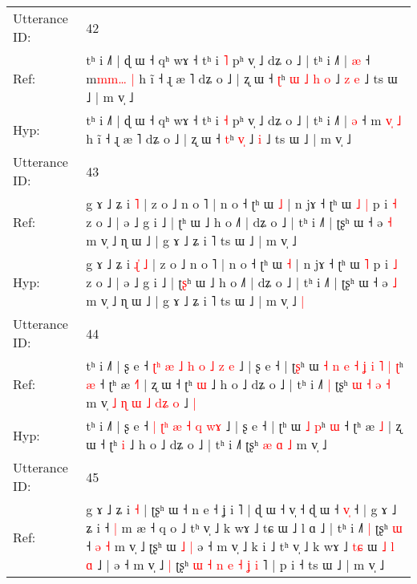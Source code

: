\documentclass[10pt]{article}
\DeclareRobustCommand{\hl}[1]{{\textcolor{red}{#1}}}
\begin{document}
\begin{longtable}{ll}
 \\
\midrule
Utterance ID: & 42 \\
Ref: & tʰ i ˩˥ | ɖ ɯ ˧ qʰ wɤ ˧ tʰ i \hl{˥} pʰ v̩ ˩ dʑ o ˩ | tʰ i ˩˥ | \hl{æ} ˧ m\hl{m}\hl{m}\hl{…} \hl{|} h ĩ ˧ ɻ æ ˥ dʑ o ˩ | ʐ ɯ ˧ \hl{ʈ}ʰ\hl{ }\hl{ɯ}\hl{ }\hl{˩} \hl{h}\hl{ }\hl{o} ˩\hl{ }\hl{z} \hl{e} ˩ ts ɯ ˩ | m v̩ ˩
 \\
Hyp: & tʰ i ˩˥ | ɖ ɯ ˧ qʰ wɤ ˧ tʰ i \hl{˧} pʰ v̩ ˩ dʑ o ˩ | tʰ i ˩˥ | \hl{ə} ˧ m\hl{ }\hl{v}\hl{̩} \hl{˩} h ĩ ˧ ɻ æ ˥ dʑ o ˩ | ʐ ɯ ˧ \hl{t}ʰ\hl{}\hl{}\hl{}\hl{} \hl{}\hl{v}\hl{̩} ˩\hl{}\hl{} \hl{i} ˩ ts ɯ ˩ | m v̩ ˩
 \\
\midrule
Utterance ID: & 43 \\
Ref: & g ɤ ˩ ʑ i\hl{}\hl{}\hl{} \hl{˥} | z o ˩ n o ˥ | n o ˧ ʈʰ ɯ \hl{˩} | n jɤ ˧ ʈʰ ɯ\hl{ }\hl{˩} \hl{|} p i \hl{˧} z o ˩ | ə ˩ g i ˩ | ʈ\hl{}ʰ ɯ ˩ h o ˩˥ | dʑ o ˩ | tʰ i ˩˥ | ʈʂʰ ɯ ˧ ə \hl{˧} m v̩ ˩ ɳ ɯ ˩ | g ɤ ˩ ʑ i ˥ ts ɯ ˩ | m v̩ ˩\hl{}\hl{}
 \\
Hyp: & g ɤ ˩ ʑ i\hl{ }\hl{ɻ}\hl{̍} \hl{˩} | z o ˩ n o ˥ | n o ˧ ʈʰ ɯ \hl{˧} | n jɤ ˧ ʈʰ ɯ\hl{}\hl{} \hl{˥} p i \hl{˩} z o ˩ | ə ˩ g i ˩ | ʈ\hl{ʂ}ʰ ɯ ˩ h o ˩˥ | dʑ o ˩ | tʰ i ˩˥ | ʈʂʰ ɯ ˧ ə \hl{˩} m v̩ ˩ ɳ ɯ ˩ | g ɤ ˩ ʑ i ˥ ts ɯ ˩ | m v̩ ˩\hl{ }\hl{|}
 \\
\midrule
Utterance ID: & 44 \\
Ref: & tʰ i ˩˥ | ʂ e ˧ \hl{ʈ}\hl{ʰ} \hl{æ}\hl{ }\hl{˩} \hl{h} \hl{o} \hl{˩} \hl{z}\hl{ }\hl{e} ˩ | ʂ e ˧ | ʈ\hl{ʂ}ʰ ɯ\hl{ }\hl{˧}\hl{ }\hl{n}\hl{ }\hl{e}\hl{ }\hl{˧}\hl{ }\hl{ʝ}\hl{ }\hl{i}\hl{ }\hl{˥} \hl{|} \hl{ʈ}ʰ \hl{æ} ˧ ʈʰ æ \hl{˧}\hl{˥} | ʐ ɯ ˧ ʈʰ \hl{ɯ} ˩ h o ˩ dʑ o ˩ | tʰ i ˩˥\hl{ }\hl{|} ʈʂʰ\hl{ }\hl{ɯ} \hl{˧} \hl{ə} \hl{˧} m v̩\hl{ }\hl{˩}\hl{ }\hl{ɳ}\hl{ }\hl{ɯ}\hl{ }\hl{˩}\hl{ }\hl{d}\hl{ʑ}\hl{ }\hl{o} ˩\hl{ }\hl{|}
 \\
Hyp: & tʰ i ˩˥ | ʂ e ˧ \hl{}\hl{|} \hl{}\hl{ʈ}\hl{ʰ} \hl{æ} \hl{˧} \hl{q} \hl{}\hl{w}\hl{ɤ} ˩ | ʂ e ˧ | ʈ\hl{}ʰ ɯ\hl{}\hl{}\hl{}\hl{}\hl{}\hl{}\hl{}\hl{}\hl{}\hl{}\hl{}\hl{}\hl{}\hl{} \hl{˩} \hl{p}ʰ \hl{ɯ} ˧ ʈʰ æ \hl{}\hl{˩} | ʐ ɯ ˧ ʈʰ \hl{i} ˩ h o ˩ dʑ o ˩ | tʰ i ˩˥\hl{}\hl{} ʈʂʰ\hl{}\hl{} \hl{æ} \hl{ɑ} \hl{˩} m v̩\hl{}\hl{}\hl{}\hl{}\hl{}\hl{}\hl{}\hl{}\hl{}\hl{}\hl{}\hl{}\hl{} ˩\hl{}\hl{}
 \\
\midrule
Utterance ID: & 45 \\
Ref: & g ɤ ˩ ʑ i \hl{˧} | ʈʂʰ ɯ ˧ n e ˧ ʝ i ˥ | ɖ ɯ ˧ v̩ ˧\hl{}\hl{} ɖ ɯ ˧ \hl{v}\hl{̩} ˧ | g ɤ ˩ ʑ i ˧\hl{ }\hl{|} m æ ˧ q o ˩ tʰ v̩ ˩ k wɤ ˩ tɕ ɯ ˩ l ɑ ˩ | tʰ i ˩˥\hl{ }\hl{|} ʈʂʰ \hl{ɯ} ˧\hl{ }\hl{ə} \hl{˧} m v̩ ˩ ʈʂʰ ɯ\hl{ }\hl{˩}\hl{ }\hl{|} ə ˧ m v̩ ˩ k i ˩\hl{}\hl{} tʰ v̩ ˩ k wɤ ˩ \hl{t}\hl{ɕ} ɯ\hl{ }\hl{˩}\hl{ }\hl{l}\hl{ }\hl{ɑ} ˩ | ə ˧ m v̩ ˩\hl{ }\hl{|} ʈʂʰ\hl{ }\hl{ɯ}\hl{ }\hl{˧}\hl{ }\hl{n}\hl{ }\hl{e}\hl{ }\hl{˧} \hl{ʝ} \hl{i}\hl{ }˥ | p i ˧ ts ɯ ˩ | m v̩ ˩

\end{longtable}
\end{document}
